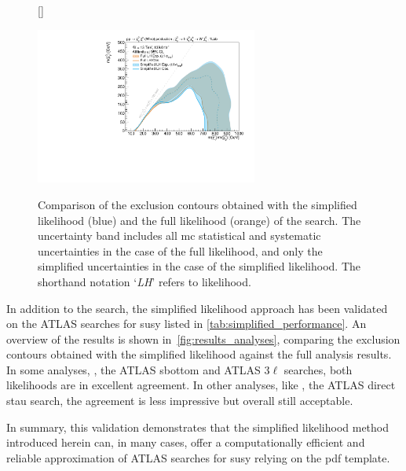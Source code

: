 \begin{figure}
[\FBwidth]
{\caption{Comparison of the exclusion contours obtained with the simplified likelihood (blue) and the full likelihood (orange) of the \onelepton search. The uncertainty band includes all \gls{mc} statistical and systematic uncertainties in the case of the full likelihood, and only the simplified uncertainties in the case of the simplified likelihood. The shorthand notation `\textit{LH}' refers to likelihood.}\label{fig:results_simplify_1Lbb}}
{\includegraphics[width=0.65\textwidth]{exclusion_1Lbb_noLabel}}
\end{figure}

In addition to the \onelepton search, the simplified likelihood approach has been validated on the ATLAS searches for \gls{susy} listed in \cref{tab:simplified_performance}. An overview of the results is shown in~\cref{fig:results_analyses}, comparing the exclusion contours obtained with the simplified likelihood against the full analysis results. In some analyses, \eg, the ATLAS sbottom and ATLAS $3\ell$ searches, both likelihoods are  in excellent agreement. In other analyses, like \eg, the ATLAS direct stau search, the agreement is less impressive but overall still acceptable.

In summary, this validation demonstrates that the simplified likelihood method introduced herein can, in many cases, offer a computationally efficient and reliable approximation of ATLAS searches for \gls{susy} relying on the  \gls{pdf} template.

